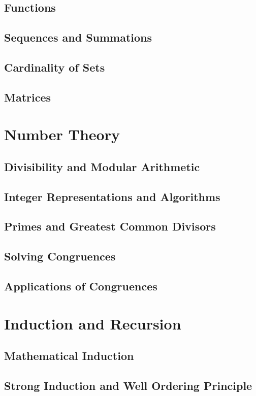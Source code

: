 \documentclass[article, 11pt]{article}
\theoremstyle{definition}
\begin{document}
    \subsection{Functions}
    \subsection{Sequences and Summations}
    \subsection{Cardinality of Sets}
    \subsection{Matrices}
    \section{Number Theory}
    \subsection{Divisibility and Modular Arithmetic}
    \subsection{Integer Representations and Algorithms}
    \subsection{Primes and Greatest Common Divisors}
    \subsection{Solving Congruences}
    \subsection{Applications of Congruences}
    \section{Induction and Recursion}
    \subsection{Mathematical Induction}
    \subsection{Strong Induction and Well Ordering Principle}
\end{document}
